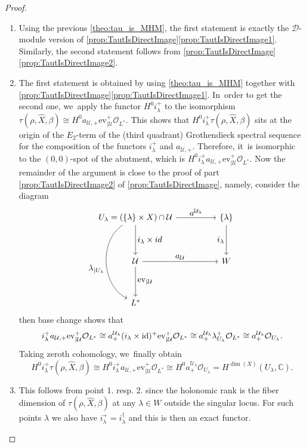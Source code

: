 \documentclass[11pt]{article}
\newcommand{\resp}{resp.\xspace}
\newcommand{\skpt}{\smallskip}
\let\mathds\mathbb
\let\ts\textstyle
\newcommand{\ev}{\mathrm{ev}}
\newcommand{\dC}{{\mathds C}}\let\C\dC
\newcommand{\cO}{\mathcal{O}}\let\O\cO
\newcommand{\cU}{\mathcal{U}}\let\mcu\cU
\DeclareMathOperator{\id}{\textup{id}}
\begin{document}
\skpt
\begin{proof}
\begin{enumerate}
\item
Using the previous \cref{theo:tau_is_MHM}, the first statement is exactly the $\mathscr{D}$\nobreakdash-mod\-ule version of \cref{prop:TautIsDirectImage}\eqref{prop:TautIsDirectImage1}. Similarly,
the second statement follows from \cref{prop:TautIsDirectImage}\eqref{prop:TautIsDirectImage2}.
\item
The first statement is obtained by using \cref{theo:tau_is_MHM} together with \cref{prop:TautIsDirectImage}\eqref{prop:TautIsDirectImage1}. In~order to get the second one, we~apply the functor $H^0i_\lambda^+$ to the isomorphism $\tau(\rho,\hat X, \beta) \cong H^0 a_{\cU,+} {\ev_{|\cU}^+}\cO_{L^*}$. This shows that $H^0 i_\lambda^+ \tau(\rho,\hat X, \beta)$ sits at the origin of the $E_2$-term of the (third quadrant) Grothendieck spectral sequence for the composition of the functors $i_\lambda^+$ and $a_{\cU,+}$. Therefore, it~is isomorphic to the $(0,0)$-spot of the abutment, which is $
H^0 i_\lambda^+ a_{\cU,+} {\ev_{|\cU}^+}\cO_{L^*}$. Now the remainder of the argument is close to the proof of part \eqref{prop:TautIsDirectImage2} of \cref{prop:TautIsDirectImage}, namely,
consider the diagram
\[
\begin{tikzcd}
U_\lambda=(\{\lambda\}\times X)\cap\mathcal{U} \ar{rr}{\ts a^{\cU_\lambda}} \ar{dd}{\ts i_\lambda\times \textup{id}} \ar[bend right=60, swap]{dddd}{\ts \lambda_{|U_\lambda}}&& \{\lambda\} \ar[swap]{dd}{\ts i_\lambda} \\ \\
\mathcal{U} \ar{dd}{\ts \ev_{|\mathcal{U}}}
\ar{rr}{\ts a_{\mathcal{U}}}&& W \\ \\L^*
\end{tikzcd}
\]
then base change shows that
\[
i_\lambda^+ a_{\cU,+} {\ev_{|\cU}^+}\cO_{L^*}\cong a^{\cU_\lambda}_+(i_\lambda\times \id)^+
{\ev_{|\cU}^+}\cO_{L^*} \cong a^{\cU_\lambda}_+ \lambda_{U_\lambda}^+\cO_{L^*} \cong a^{\cU_\lambda}_+ \cO_{U_\lambda}.
\]
Taking zeroth cohomology, we~finally obtain
\[
H^0 i_\lambda^+ \tau(\rho,\hat X, \beta) \cong H^0 i_\lambda^+ a_{\cU,+} {\ev_{|\cU}^+}\cO_{L^*}
\cong
H^0 a^{\cU_\lambda}_+ \cO_{U_\lambda}
= H^{\dim(X)}(U_\lambda,\dC).
\]
\item
This follows from point 1. \resp 2. since the holonomic rank is the fiber dimension
of $\tau(\rho,\hat{X},\beta)$ at any $\lambda\in W$ outside the singular locus. For such points $\lambda$ we also have $i_\lambda^+=i_\lambda^\dag$ and this is then an exact functor.\qedhere
\end{enumerate}
\end{proof}
\end{document}
